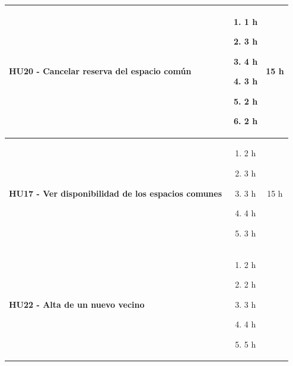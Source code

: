 \begin{longtable}{|p{10.5cm}|p{2.5cm}|c|}
    \\ \hline
        
            \textbf{HU20 - Cancelar reserva del espacio común} 
        
        &

            \begin{enumerate}[leftmargin=*,nosep]
                \item 1 h
                \item 3 h
                \item 4 h
                \item 3 h
                \item 2 h
                \item 2 h
            \end{enumerate} 
        
        &
            15 h
    
    \\ \hline
        
            \textbf{HU17 - Ver disponibilidad de los espacios comunes} 
        
        &

            \begin{enumerate}[leftmargin=*,nosep]
                \item 2 h
                \item 3 h
                \item 3 h
                \item 4 h
                \item 3 h
            \end{enumerate} 
        
        &
            15 h
    
    \\ \hline
        
            \textbf{HU22 - Alta de un nuevo vecino} 
        
        &

            \begin{enumerate}[leftmargin=*,nosep]
                \item 2 h
                \item 2 h
                \item 3 h
                \item 4 h
                \item 5 h
            \end{enumerate} 
        

\end{longtable}
